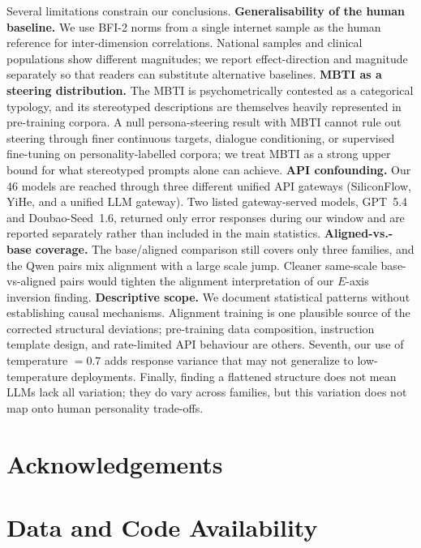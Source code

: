 \documentclass[11pt]{article}
\begin{document}
Several limitations constrain our conclusions.
\textbf{Generalisability of the human baseline.}
We use BFI-2 norms from a single internet sample \citep{soto2017bfi2} as the human reference for inter-dimension correlations.
National samples and clinical populations show different magnitudes; we report effect-direction and magnitude separately so that readers can substitute alternative baselines.
\textbf{MBTI as a steering distribution.}
The MBTI is psychometrically contested as a categorical typology, and its stereotyped descriptions are themselves heavily represented in pre-training corpora.
A null persona-steering result with MBTI cannot rule out steering through finer continuous targets, dialogue conditioning, or supervised fine-tuning on personality-labelled corpora; we treat MBTI as a strong upper bound for what stereotyped prompts alone can achieve.
\textbf{API confounding.}
Our 46 models are reached through three different unified API gateways (SiliconFlow, YiHe, and a unified LLM gateway).
Two listed gateway-served models, GPT~5.4 and Doubao-Seed~1.6, returned only error responses during our window and are reported separately rather than included in the main statistics.
\textbf{Aligned-vs.-base coverage.}
The base/aligned comparison still covers only three families, and the Qwen pairs mix alignment with a large scale jump.
Cleaner same-scale base-vs-aligned pairs would tighten the alignment interpretation of our $E$-axis inversion finding.
\textbf{Descriptive scope.}
We document statistical patterns without establishing causal mechanisms.
Alignment training is one plausible source of the corrected structural deviations; pre-training data composition, instruction template design, and rate-limited API behaviour are others.
Seventh, our use of temperature $= 0.7$ adds response variance that may not generalize to low-temperature deployments.
Finally, finding a flattened structure does not mean LLMs lack all variation; they do vary across families, but this variation does not map onto human personality trade-offs.

\section*{Acknowledgements}

\section*{Data and Code Availability}
\end{document}
